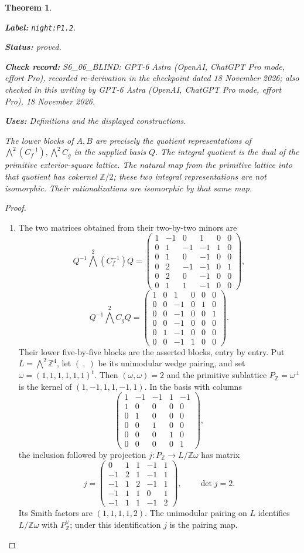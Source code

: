 \documentclass[11pt,a4paper]{article}
\newtheorem{theorem}{Theorem}[section]
\theoremstyle{definition}
\newcommand{\StatementRecord}[4]{\par\smallskip\begingroup\upshape\raggedright\noindent\textbf{Label:} \nolinkurl{#1}.\par\noindent\textbf{Status:} #2.\par\noindent\textbf{Check record:} #3.\par\noindent\textbf{Uses:} #4.\par\endgroup\smallskip}
\newcommand{\CurrentChecker}{GPT-6 Astra (OpenAI, ChatGPT Pro mode, effort Pro), 18 November 2026}
\begin{document}
\begin{theorem}\label{night:P1.2}
\StatementRecord{night:P1.2}{proved}{S6\_06\_BLIND: GPT-6 Astra (OpenAI, ChatGPT Pro mode, effort Pro), recorded re-derivation in the checkpoint dated 18 November 2026; also checked in this writing by \CurrentChecker}{Definitions and the displayed constructions}
The lower blocks of $A,B$ are precisely the quotient representations of
$\bigwedge^2(C_f^{-1}),\bigwedge^2C_g$ in the supplied basis $Q$.
The integral quotient is the dual of the primitive exterior-square
lattice.  The natural map from the primitive lattice into that quotient
has cokernel $\mathbb Z/2$; these two integral representations are not
isomorphic.  Their rationalizations are isomorphic by that same map.
\end{theorem}
\begin{proof}
\begin{enumerate}[label=\arabic*.]
\item The two matrices obtained from their two-by-two minors are
\[
Q^{-1}\bigwedge^2(C_f^{-1})Q=
\begin{pmatrix}
1&-1&0&1&0&0\\0&1&-1&-1&1&0\\0&1&0&-1&0&0\\
0&2&-1&-1&0&1\\0&2&0&-1&0&0\\0&1&1&-1&0&0
\end{pmatrix},
\]
\[
Q^{-1}\bigwedge^2C_gQ=
\begin{pmatrix}
1&0&1&0&0&0\\0&0&-1&0&1&0\\0&0&-1&0&0&1\\
0&0&-1&0&0&0\\0&1&-1&0&0&0\\0&0&-1&1&0&0
\end{pmatrix}.
\]
Their lower five-by-five blocks are the asserted blocks, entry by entry.
Put $L=\bigwedge^2\mathbb Z^4$, let $(\ ,\ )$ be its unimodular wedge
pairing, and set $\omega=(1,1,1,1,1,1)^t$.
Then $(\omega,\omega)=2$ and the primitive sublattice
$P_{\mathbb Z}=\omega^\perp$ is the kernel of
$(1,-1,1,1,-1,1)$.  In the basis with columns
\[
\begin{pmatrix}
1&-1&-1&1&-1\\1&0&0&0&0\\0&1&0&0&0\\
0&0&1&0&0\\0&0&0&1&0\\0&0&0&0&1
\end{pmatrix},
\]
the inclusion followed by projection
$j:P_{\mathbb Z}\longrightarrow L/\mathbb Z\omega$ has matrix
\[
j=\begin{pmatrix}
0&1&1&-1&1\\-1&2&1&-1&1\\-1&1&2&-1&1\\
-1&1&1&0&1\\-1&1&1&-1&2
\end{pmatrix},\qquad \det j=2.
\]
Its Smith factors are $(1,1,1,1,2)$.  The unimodular pairing on $L$
identifies $L/\mathbb Z\omega$ with $P_{\mathbb Z}^\vee$;
under this identification $j$ is the pairing map.


\end{enumerate}
\end{proof}
\end{document}
